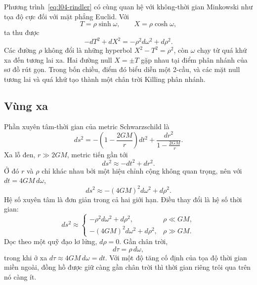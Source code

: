 Phương trình~\eqref{eq:l04-rindler} có cùng quan hệ với không-thời gian Minkowski như tọa độ cực đối với mặt phẳng Euclid. Với
\begin{equation}
T=\rho\sinh\omega,
\qquad
X=\rho\cosh\omega,
\end{equation}
ta thu được
\begin{equation}
-dT^2+dX^2=-\rho^2d\omega^2+d\rho^2.
\end{equation}
Các đường \(\rho\) không đổi là những hyperbol \(X^2-T^2=\rho^2\), còn \(\omega\) chạy từ quá khứ xa đến tương lai xa. Hai đường null \(X=\pm T\) gặp nhau tại điểm phân nhánh của sơ đồ rút gọn. Trong bốn chiều, điểm đó biểu diễn một 2-cầu, và các mặt null tương lai và quá khứ tạo thành một chân trời Killing phân nhánh.

\subsection{Vùng xa}

Phần xuyên tâm-thời gian của metric Schwarzschild là
\begin{equation}
ds^2
=-\left(1-\frac{2GM}{r}\right)dt^2
+\frac{dr^2}{1-\frac{2GM}{r}}.
\label{eq:l04-schwarzschild}
\end{equation}
Xa lỗ đen, \(r\gg2GM\), metric tiến gần tới
\begin{equation}
ds^2\approx-dt^2+dr^2.
\end{equation}
Ở đó \(r\) và \(\rho\) chỉ khác nhau bởi một hiệu chỉnh cộng không quan trọng, nên với \(dt=4GM\,d\omega\),
\begin{equation}
ds^2\approx-(4GM)^2d\omega^2+d\rho^2.
\label{eq:l04-far}
\end{equation}
Hệ số xuyên tâm là đơn giản trong cả hai giới hạn. Điều thay đổi là hệ số thời gian:
\begin{equation}
ds^2\approx
\begin{cases}
-\rho^2d\omega^2+d\rho^2, & \rho\ll GM,\\[3pt]
-(4GM)^2d\omega^2+d\rho^2, & \rho\gg GM.
\end{cases}
\label{eq:l04-two-limits}
\end{equation}
Dọc theo một quỹ đạo lơ lửng, \(d\rho=0\). Gần chân trời,
\begin{equation}
d\tau=\rho\,d\omega,
\end{equation}
trong khi ở xa \(d\tau\approx4GM\,d\omega=dt\). Với một độ tăng cố định của tọa độ thời gian miền ngoài, đồng hồ được giữ càng gần chân trời thì thời gian riêng trôi qua trên nó càng ít.

